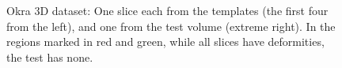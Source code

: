 \documentclass{article}
\begin{document}
\begin{figure}
\begin{subfigure}[b]{0.19\linewidth}
\captionsetup{labelformat=empty}
        \caption{}
     \end{subfigure}
    \begin{subfigure}[b]{0.186\linewidth}
\captionsetup{labelformat=empty}
        \caption{}
     \end{subfigure}
     \caption[Okra 3D dataset]{Okra 3D dataset: One slice each from the templates (the
       first four from the left), and one from the test volume
       (extreme right). In the regions marked in red and green, while
       all slices have deformities, the test
       has none.}
\label{fig:templates_test_okra}
\end{figure}
\end{document}
